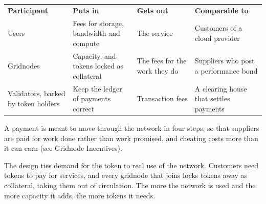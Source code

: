 \documentclass[a4paper,oneside]{article}
\newcommand{\economystepcard}[5]{\node[economycard] (#1) at (#2) {\parbox[t][19mm]{24.6mm}{\raggedright{\Large\color{orange}\bfseries #3}\hspace{1.5mm}{\footnotesize\bfseries\MakeUppercase{#4}}\\[1.2mm]#5}};}
\begin{document}
{\renewcommand{\arraystretch}{1.4}
\begin{center}
\small
\begin{tabular}{>{\raggedright\arraybackslash}p{2.4cm}>{\raggedright\arraybackslash}p{3.6cm}>{\raggedright\arraybackslash}p{2.4cm}>{\raggedright\arraybackslash}p{3.1cm}}
\rowcolor{orange} \color{black}\textbf{Participant} & \color{black}\textbf{Puts in} & \color{black}\textbf{Gets out} & \color{black}\textbf{Comparable to} \\
Users & Fees for storage, bandwidth and compute & The service & Customers of a cloud provider \\
\rowcolor{headerbgl} Gridnodes & Capacity, and tokens locked as collateral & The fees for the work they do & Suppliers who post a performance bond \\
Validators, backed by token holders & Keep the ledger of payments correct & Transaction fees & A clearing house that settles payments \\
\end{tabular}
\end{center}}

\noindent A payment is meant to move through the network in four steps, so that suppliers are paid for work done rather than work promised, and cheating costs more than it can earn (see Gridnode Incentives).

\begin{center}
\end{center}

\noindent The design ties demand for the token to real use of the network. Customers need tokens to pay for services, and every gridnode that joins locks tokens away as collateral, taking them out of circulation. The more the network is used and the more capacity it adds, the more tokens it needs.
\end{document}
